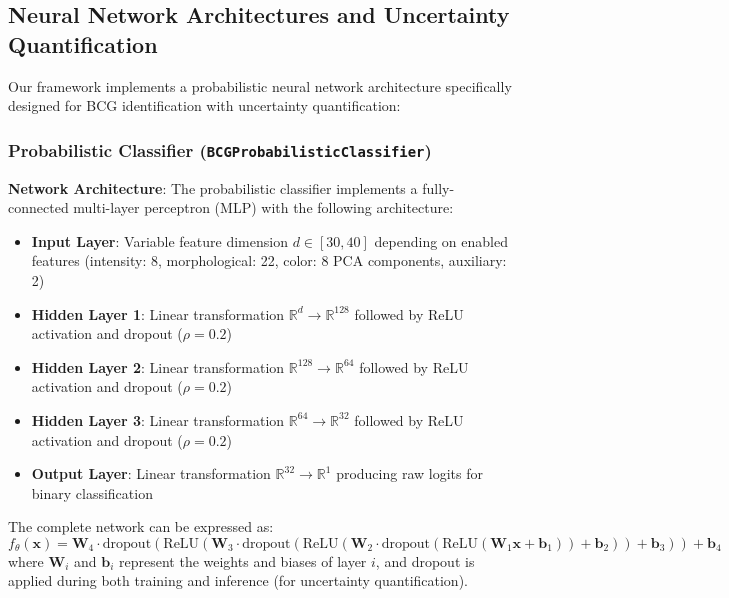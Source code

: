 \documentclass[twocolumn,10pt]{aastex631}
\begin{document}
\subsection{Neural Network Architectures and Uncertainty Quantification}

Our framework implements a probabilistic neural network architecture specifically designed for BCG identification with uncertainty quantification:

\subsubsection{Probabilistic Classifier (\texttt{BCGProbabilisticClassifier})}

\textbf{Network Architecture}: The probabilistic classifier implements a fully-connected multi-layer perceptron (MLP) with the following architecture:

\begin{itemize}
\item \textbf{Input Layer}: Variable feature dimension $d \in [30, 40]$ depending on enabled features (intensity: 8, morphological: 22, color: 8 PCA components, auxiliary: 2)
\item \textbf{Hidden Layer 1}: Linear transformation $\mathbb{R}^{d} \rightarrow \mathbb{R}^{128}$ followed by ReLU activation and dropout ($\rho = 0.2$)
\item \textbf{Hidden Layer 2}: Linear transformation $\mathbb{R}^{128} \rightarrow \mathbb{R}^{64}$ followed by ReLU activation and dropout ($\rho = 0.2$)
\item \textbf{Hidden Layer 3}: Linear transformation $\mathbb{R}^{64} \rightarrow \mathbb{R}^{32}$ followed by ReLU activation and dropout ($\rho = 0.2$)
\item \textbf{Output Layer}: Linear transformation $\mathbb{R}^{32} \rightarrow \mathbb{R}^{1}$ producing raw logits for binary classification
\end{itemize}

The complete network can be expressed as:
\begin{equation}
f_{\theta}(\mathbf{x}) = \mathbf{W}_4 \cdot \text{dropout}(\text{ReLU}(\mathbf{W}_3 \cdot \text{dropout}(\text{ReLU}(\mathbf{W}_2 \cdot \text{dropout}(\text{ReLU}(\mathbf{W}_1 \mathbf{x} + \mathbf{b}_1)) + \mathbf{b}_2)) + \mathbf{b}_3)) + \mathbf{b}_4
\end{equation}
where $\mathbf{W}_i$ and $\mathbf{b}_i$ represent the weights and biases of layer $i$, and dropout is applied during both training and inference (for uncertainty quantification).
\end{document}
